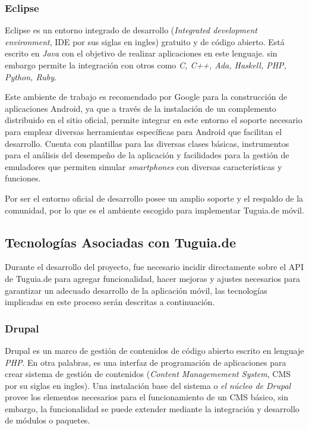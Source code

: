 \subsubsection{Eclipse}

Eclipse es un entorno integrado de desarrollo (\textit{Integrated development environment}, IDE por sus siglas en ingles) gratuito y de código abierto. Está escrito en \textit{Java} con el objetivo de realizar aplicaciones en este lenguaje. sin embargo permite la integración con otros como \textit{C, C++, Ada, Haskell, PHP, Python, Ruby}.

Este ambiente de trabajo es recomendado por Google para la construcción de aplicaciones Android, ya que a través de la instalación de un complemento distribuido en el sitio oficial, permite integrar en este entorno el soporte necesario para emplear diversas herramientas específicas para Android que facilitan el desarrollo. Cuenta con plantillas para las diversas clases básicas, instrumentos para el análisis del desempeño de la aplicación y facilidades para la gestión de emuladores que permiten simular \textit{smartphones} con diversas características y funciones.

Por ser el entorno oficial de desarrollo posee un amplio soporte y el respaldo de la comunidad, por lo que es el ambiente escogido para implementar Tuguia.de móvil.

\subsection{Tecnologías Asociadas con Tuguia.de} \label{subsect:Asociadas_movil}

Durante el desarrollo del proyecto, fue necesario incidir directamente sobre el API de Tuguia.de para agregar funcionalidad, hacer mejoras y ajustes necesarios para garantizar un adecuado desarrollo de la aplicación móvil, las tecnologías implicadas en este proceso serán descritas a continuación.

\subsubsection{Drupal}

Drupal es un marco de gestión de contenidos de código abierto escrito en lenguaje \textit{PHP}. En otra palabras, es una interfaz de programación de aplicaciones para crear sistema de gestión de contenidos (\textit{Content Managemement System}, CMS por su siglas en ingles). Una instalación base del sistema o \textit{el núcleo de Drupal} provee los elementos necesarios para el funcionamiento de un CMS básico, sin embargo, la funcionalidad se puede extender mediante la integración y desarrollo de módulos o paquetes\cite{TV10}.

